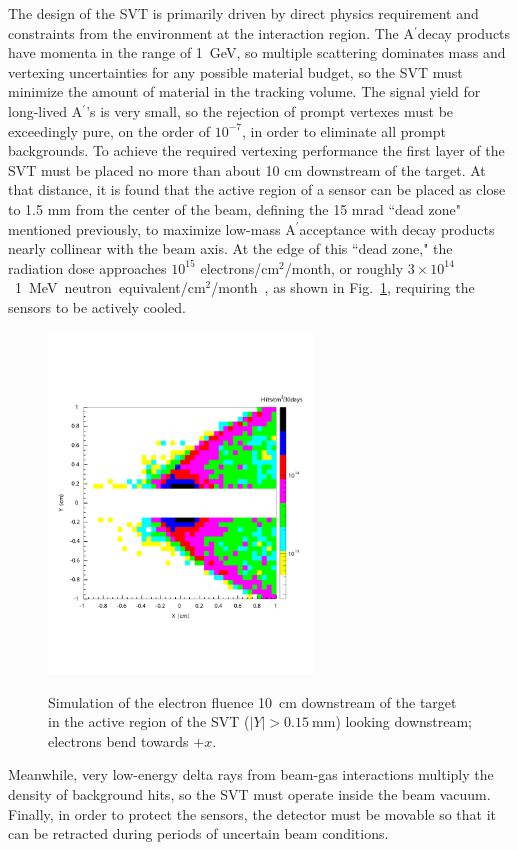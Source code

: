 \documentclass[final,3p,times,twocolumn]{elsarticle}
\newcommand{\Aprime}{A\ensuremath{^\prime}}
\newcommand{\fluenceunit}{1~MeV~neutron~equivalent/cm\ensuremath{^2}}
\begin{document}
The design of the SVT is primarily driven by direct physics requirement and constraints from the 
environment at the interaction region. The \Aprime decay products 
have momenta in the range of 1~GeV, so multiple scattering dominates mass and vertexing 
uncertainties for any possible material budget, so the SVT must minimize the amount of 
material in the tracking volume. The signal yield for long-lived \Aprime's is very small, so 
the rejection of prompt vertexes must be exceedingly pure, on the order of $10^{-7}$, in order to 
eliminate all prompt backgrounds. To achieve the required vertexing performance the first layer of the 
SVT must be placed no more than about 10 cm downstream of the target. At that distance, it is found 
that the active region of a sensor can be placed as close to 1.5 mm from the center of the beam, 
defining the 15 mrad ``dead zone" mentioned previously, to maximize low-mass \Aprime acceptance 
with decay products nearly collinear with the beam axis. At the edge of this ``dead zone," the 
radiation dose approaches $10^{15}$ electrons/cm$^2$/month, or roughly 
$3 \times 10^{14}$~\fluenceunit{}/month~\cite{Rashevskaya:2002nd}, as shown in 
Fig.~\ref{fig:radiation},  requiring the sensors to be actively cooled.
\begin{figure}[]
\includegraphics[width=7cm]{figures/radiation}
\label{fig:radiation}
\caption{{\small Simulation of the electron fluence 10~cm downstream of the target in the active region 
of the SVT ($|Y|>0.15~$mm) looking downstream; electrons bend towards $+x$.}}
\end{figure}
Meanwhile, very low-energy delta rays from 
beam-gas interactions multiply the density of background hits, so the SVT must operate inside the 
beam vacuum.  Finally, in order to protect the sensors, the detector must be movable so that it can be 
retracted during periods of uncertain beam conditions.  
\end{document}
